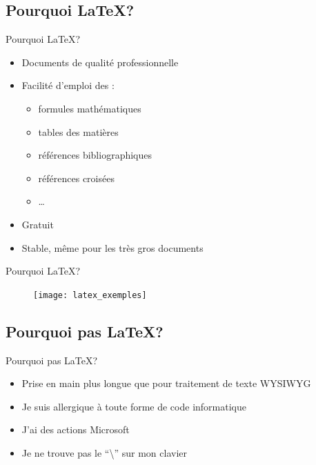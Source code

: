 \documentclass[10pt,svgnames,usenames,table]{beamer} %
\begin{document}
\subsection{Pourquoi \LaTeX{}?}
\begin{frame}{Pourquoi \LaTeX{}?}

  \begin{itemize}
      \item Documents de qualité professionnelle
    \item Facilité d'emploi des :
    \begin{itemize}
        \item formules mathématiques
        \item tables des matières
        \item références bibliographiques
        \item références croisées
        \item \ldots{}
    \end{itemize}
    \item Gratuit
    \item Stable, même pour les très gros documents
  \end{itemize}
\end{frame}

\begin{frame}{Pourquoi \LaTeX{}?}

\begin{figure}[htbp]
\begin{center}
\texttt{[image: latex\_exemples]}
\end{center}
\end{figure}
\end{frame}

\subsection{Pourquoi pas \LaTeX{}?}
\begin{frame}{Pourquoi pas \LaTeX{}?}

  \begin{itemize}
    \item Prise en main plus longue que pour traitement de texte WYSIWYG
    \item Je suis allergique à toute forme de code informatique
    \item J'ai des actions Microsoft
    \item Je ne trouve pas le ``\textbackslash'' sur mon clavier
  \end{itemize}
\end{frame}
\end{document}
